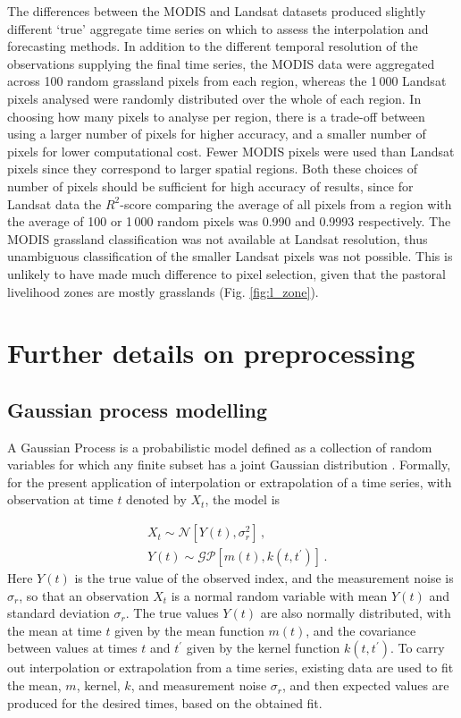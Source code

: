 \documentclass[review]{elsarticle}
\begin{document}
The differences between the MODIS and Landsat datasets produced slightly different `true' aggregate time series on which to assess the interpolation and forecasting methods. In addition to the different temporal resolution of the observations supplying the final time series, the MODIS data were aggregated across 100 random grassland pixels from each region, whereas the 1\,000 Landsat pixels analysed were randomly distributed over the whole of each region. In choosing how many pixels to analyse per region, there is a trade-off between using a larger number of pixels for higher accuracy, and a smaller number of pixels for lower computational cost. Fewer MODIS pixels were used than Landsat pixels since they correspond to larger spatial regions. Both these choices of number of pixels should be sufficient for high accuracy of results, since for Landsat data the $R^2$-score comparing the average of all pixels from a region with the average of 100 or 1\,000 random pixels was 0.990 and 0.9993 respectively. The MODIS grassland classification was not available at Landsat resolution, thus unambiguous classification of the smaller Landsat pixels was not possible. This is unlikely to have made much difference to pixel selection, given that the pastoral livelihood zones are mostly grasslands (Fig. \ref{fig:l_zone}). 

\section{Further details on preprocessing}

\subsection{Gaussian process modelling} \label{sec:GPexplain}
A Gaussian Process is a probabilistic model defined as a collection of random variables for which any finite subset has a joint Gaussian distribution \citep{gpm}. Formally, for the present application of interpolation or extrapolation of a time series, with observation at time $t$ denoted by $X_t$, the model is

\begin{align}
    &X_t\sim \mathcal{N}\left[ Y(t),\sigma_r^2\right]\,,\\
    &Y(t) \sim \mathcal{GP}\left[ m(t),k(t,t^{\prime})\right]\,.
\end{align}
Here $Y(t)$ is the true value of the observed index, and the measurement noise is $\sigma_r$, so that an observation $X_t$ is a normal random variable with mean $Y(t)$ and standard deviation $\sigma_r$. The true values $Y(t)$ are also normally distributed, with the mean at time $t$ given by the mean function $m(t)$, and the covariance between values at times $t$ and $t^{\prime}$ given by the kernel function $k(t,t^{\prime})$. To carry out interpolation or extrapolation from a time series, existing data are used to fit the mean, $m$, kernel, $k$, and measurement noise $\sigma_r$, and then expected values are produced for the desired times, based on the obtained fit.
\end{document}

